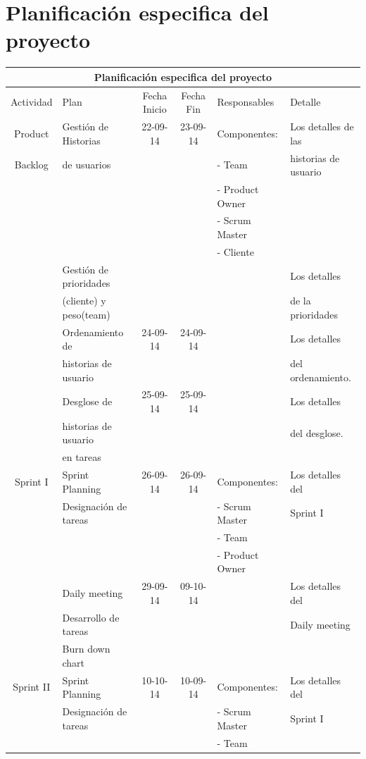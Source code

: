 \documentclass[11pt,letterpaper]{report}
\begin{document}
\section{Planificación especifica del proyecto}
\begin{tabular}{|c|p{4cm}|c|c|l|p{3cm}|}
	\hline
	\multicolumn{6}{|c|}{Planificación especifica del proyecto} \\ \hline
	Actividad & Plan & Fecha Inicio & Fecha Fin & Responsables & Detalle \\ \hline
	Product & Gestión de Historias  & 22-09-14 & 23-09-14 & Componentes: & Los detalles de las \\
	Backlog & de usuarios&&& - Team & historias de usuario\\
	&&&& - Product Owner & \\
	&&&& - Scrum Master & \\
	&&&& - Cliente & \\
	& Gestión de prioridades& ~ & ~ && Los detalles  \\ 
	& (cliente) y peso(team)&&&&de la prioridades\\ 
	\cline{2-4} \cline{6-6}
	& Ordenamiento de & 24-09-14 & 24-09-14 && Los detalles \\
	& historias de usuario & &&& del ordenamiento. \\
	\cline{2-4} \cline{6-6}
	& Desglose de& 25-09-14 & 25-09-14 && Los detalles \\
	& historias de usuario & &&& del desglose. \\
	& en tareas &&&& \\
	\hline %
	Sprint I& Sprint Planning & 26-09-14 & 26-09-14 &  Componentes: & Los detalles del \\
	& Designación de tareas &  &  & - Scrum Master & Sprint I \\
	& & & & - Team & \\
	& & & & - Product Owner & \\
	\cline{2-4} \cline{6-6}
	& Daily meeting & 29-09-14 & 09-10-14 & & Los detalles del  \\ 
	& Desarrollo de tareas &&&& Daily meeting\\
	& Burn down chart &&&& \\
	\hline %
	Sprint II& Sprint Planning & 10-10-14 & 10-09-14 &  Componentes: & Los detalles del \\
	& Designación de tareas &  &  & - Scrum Master & Sprint I \\
	& & & & - Team & \\

\end{tabular}
\end{document}
